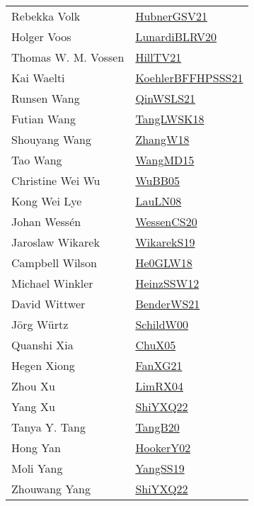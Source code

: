 {\begin{longtable}{p{4cm}p{20cm}}
Rebekka Volk & \href{articles/HubnerGSV21.pdf}{HubnerGSV21}\cite{HubnerGSV21} \\
Holger Voos & \href{articles/LunardiBLRV20.pdf}{LunardiBLRV20}\cite{LunardiBLRV20} \\
Thomas W. M. Vossen & \href{papers/HillTV21.pdf}{HillTV21}\cite{HillTV21} \\
Kai Waelti & \href{articles/KoehlerBFFHPSSS21.pdf}{KoehlerBFFHPSSS21}\cite{KoehlerBFFHPSSS21} \\
Runsen Wang & \href{articles/QinWSLS21.pdf}{QinWSLS21}\cite{QinWSLS21} \\
Futian Wang & \href{}{TangLWSK18}\cite{TangLWSK18} \\
Shouyang Wang & \href{articles/ZhangW18.pdf}{ZhangW18}\cite{ZhangW18} \\
Tao Wang & \href{articles/WangMD15.pdf}{WangMD15}\cite{WangMD15} \\
Christine Wei Wu & \href{papers/WuBB05.pdf}{WuBB05}\cite{WuBB05} \\
Kong Wei Lye & \href{papers/LauLN08.pdf}{LauLN08}\cite{LauLN08} \\
Johan Wess{\'{e}}n & \href{papers/WessenCS20.pdf}{WessenCS20}\cite{WessenCS20} \\
Jaroslaw Wikarek & \href{articles/WikarekS19.pdf}{WikarekS19}\cite{WikarekS19} \\
Campbell Wilson & \href{papers/He0GLW18.pdf}{He0GLW18}\cite{He0GLW18} \\
Michael Winkler & \href{articles/HeinzSSW12.pdf}{HeinzSSW12}\cite{HeinzSSW12} \\
David Wittwer & \href{papers/BenderWS21.pdf}{BenderWS21}\cite{BenderWS21} \\
J{\"{o}}rg W{\"{u}}rtz & \href{articles/SchildW00.pdf}{SchildW00}\cite{SchildW00} \\
Quanshi Xia & \href{papers/ChuX05.pdf}{ChuX05}\cite{ChuX05} \\
Hegen Xiong & \href{articles/FanXG21.pdf}{FanXG21}\cite{FanXG21} \\
Zhou Xu & \href{papers/LimRX04.pdf}{LimRX04}\cite{LimRX04} \\
Yang Xu & \href{}{ShiYXQ22}\cite{ShiYXQ22} \\
Tanya Y. Tang & \href{papers/TangB20.pdf}{TangB20}\cite{TangB20} \\
Hong Yan & \href{papers/HookerY02.pdf}{HookerY02}\cite{HookerY02} \\
Moli Yang & \href{papers/YangSS19.pdf}{YangSS19}\cite{YangSS19} \\
Zhouwang Yang & \href{}{ShiYXQ22}\cite{ShiYXQ22} \\

\end{longtable}}
